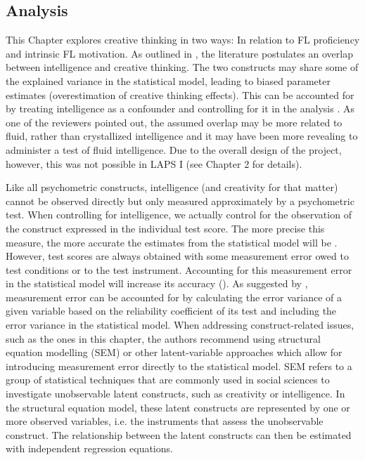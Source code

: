 \documentclass[output=paper]{langsci/langscibook}
\begin{document}
\subsection{Analysis}\label{sec:06:3.3}

This Chapter explores creative thinking in two ways: In relation to FL proficiency and intrinsic FL motivation. As outlined in , the literature postulates an overlap between intelligence and creative thinking. The two constructs may share some of the explained variance in the statistical model, leading to biased parameter estimates (overestimation of creative thinking effects). This can be accounted for by treating intelligence as a confounder and controlling for it in the analysis \citep{Rohrer2018}. As one of the reviewers pointed out, the assumed overlap may be more related to fluid, rather than crystallized intelligence and it may have been more revealing to administer a test of fluid intelligence. Due to the overall design of the project, however, this was not possible in LAPS I (see Chapter 2 for details).

Like all psychometric constructs, intelligence (and creativity for that matter) cannot be observed directly but only measured approximately by a psychometric test. When controlling for intelligence, we actually control for the observation of the construct expressed in the individual test score. The more precise this measure, the more accurate the estimates from the statistical model will be \citep{Vanhove2015}. However, test scores are always obtained with some measurement error owed to test conditions or to the test instrument. Accounting for this measurement error in the statistical model will increase its accuracy (\citealt{BrunnerAustin2009}). As suggested by \citet{WestfallYarkoni2016}, measurement error can be accounted for by calculating the error variance of a given variable based on the reliability coefficient of its test and including the error variance in the statistical model. When addressing construct-related issues, such as the ones in this chapter, the authors recommend using structural equation modelling (SEM) or other latent-variable approaches which allow for introducing measurement error directly to the statistical model. SEM refers to a group of statistical techniques that are commonly used in social sciences to investigate unobservable latent constructs, such as creativity or intelligence. In the structural equation model, these latent constructs are represented by one or more observed variables, i.e. the instruments that assess the unobservable construct. The relationship between the latent constructs can then be estimated with independent regression equations. 
\end{document}
